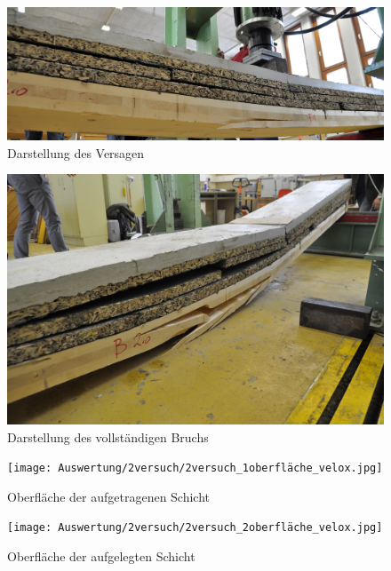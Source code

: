 \begin{figure}
\begin{center}
\includegraphics[scale =0.5]{Auswertung/2versuch/2versuch_versagen.jpg}
\caption{Darstellung des Versagen}
\label{2versuch versagen}
\end{center}
\end{figure}


\begin{figure}
\begin{center}
\includegraphics[scale =0.1]{Auswertung/2versuch/BT2_bruchbild.jpg}
\caption{Darstellung des vollständigen Bruchs}
\label{2versuch bruchbild}
\end{center}
\end{figure}


\begin{figure}[h]
\begin{minipage}[hbt]{7cm}	
	\texttt{[image: Auswertung/2versuch/2versuch\_1oberfläche\_velox.jpg]}
	\caption{Oberfläche der aufgetragenen Schicht}
	\label{velos unten}
\end{minipage}
\hfill
\begin{minipage}[hbt]{7cm}
	\texttt{[image: Auswertung/2versuch/2versuch\_2oberfläche\_velox.jpg]}
	\caption{Oberfläche der aufgelegten Schicht}
	\label{velox ober}
\end{minipage}
\end{figure}

